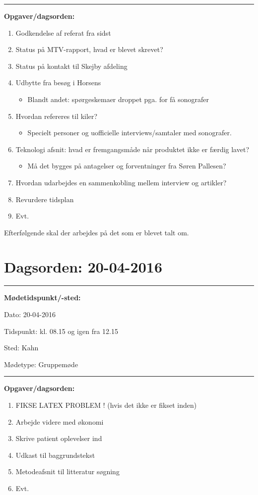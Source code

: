 \hrule
\textbf{Opgaver/dagsorden:} \newline
\begin{enumerate}
	\item Godkendelse af referat fra sidst
	\item Status på MTV-rapport, hvad er blevet skrevet?
	\item Status på kontakt til Skejby afdeling
	\item Udbytte fra besøg i Horsens
	\begin{itemize}
		\item Blandt andet: spørgeskemaer droppet pga. for få sonografer
	\end{itemize}
	\item Hvordan refereres til kiler? 
	\begin{itemize}
		\item Specielt personer og uofficielle interviews/samtaler med sonografer.
	\end{itemize}
	\item Teknologi afsnit: hvad er fremgangsmåde når produktet ikke er færdig lavet? 
	\begin{itemize}
		\item Må det bygges på antagelser og forventninger fra Søren Pallesen?
	\end{itemize}  
	\item Hvordan udarbejdes en sammenkobling mellem interview og artikler?
	\item Revurdere tidsplan
	\item Evt. 
\end{enumerate} 

Efterfølgende skal der arbejdes på det som er blevet talt om. 

\newpage
\section{Dagsorden: 20-04-2016 }
\hrule
\textbf{Mødetidspunkt/-sted:} 

Dato: \tabto{7em} 20-04-2016

Tidspunkt: \tabto{7em} kl. 08.15 og igen fra 12.15 

Sted: \tabto{7em} Kahn 

Mødetype: \tabto{7em} Gruppemøde \newline


\hrule
\textbf{Opgaver/dagsorden:} \newline
\begin{enumerate}
	\item FIKSE LATEX PROBLEM ! (hvis det ikke er fikset inden)
	\item Arbejde videre med økonomi 
	\item Skrive patient oplevelser ind 
	\item Udkast til baggrundstekst
	\item Metodeafsnit til litteratur søgning
	\item Evt. 
\end{enumerate} 

